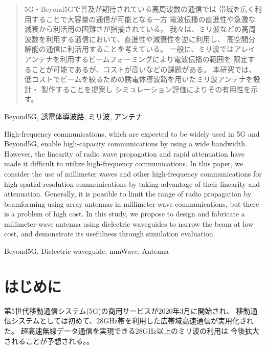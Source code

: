 \documentclass[technicalreport]{ieicej}
\begin{document}
\begin{abstract}
  5G・Beyond5Gで普及が期待されている高周波数の通信では
  帯域を広く利用することで大容量の通信が可能となる一方
  電波伝播の直進性や急激な減衰から利活用の困難さが指摘されている。
  我々は、ミリ波などの高周波数を利用する通信において、直進性や減衰性を逆に利用し、
  高空間分解能の通信に利活用することを考えている。
  一般に、ミリ波ではアレイアンテナを利用するビームフォーミングにより電波伝播の範囲を
  限定することが可能であるが、コストが高いなどの課題がある。
  本研究では、低コストでビームを絞るための誘電体導波路を用いたミリ波アンテナを設計・
  製作することを提案し
  シミュレーション評価によりその有用性を示す。
\end{abstract}
\begin{keyword}
Beyond5G, 誘電体導波路, ミリ波, アンテナ
\end{keyword}
\begin{eabstract}
High-frequency communications,
which are expected to be widely used in 5G and Beyond5G,
enable high-capacity communications by using a wide bandwidth.
However, the linearity of radio wave propagation and rapid attenuation
have made it difficult to utilize high-frequency communications.
In this paper, we consider the use of millimeter waves and
other high-frequency communications for high-spatial-resolution communications
by taking advantage of their linearity and attenuation.
Generally, it is possible to limit the range of radio propagation by
beamforming using array antennas in millimeter-wave communications,
but there is a problem of high cost.
In this study,
we propose to design and fabricate a millimeter-wave antenna using
dielectric waveguides to narrow the beam at low cost,
and demonstrate its usefulness through simulation evaluation.
\end{eabstract}
\begin{ekeyword}
Beyond5G, Dielectric waveguide, mmWave, Antenna
\end{ekeyword}
\maketitle

\section{はじめに}

第5世代移動通信システム(5G)の商用サービスが2020年3月に開始され、
移動通信システムとしては初めて、28GHz帯を利用した広帯域高速通信が実用化された。
超高速無線データ通信を実現できる28GHz以上のミリ波の利用は
今後拡大されることが予想される。\cite{docomo_6G_white_paper}。
\end{document}
